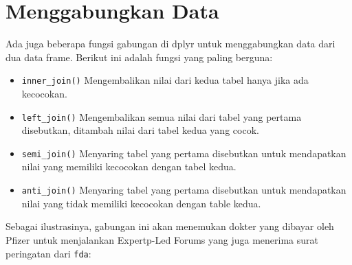 \documentclass[
]{book}
\newenvironment{Shaded}{\begin{snugshade}}{\end{snugshade}}
\newcommand{\DataTypeTok}[1]{\textcolor[rgb]{0.13,0.29,0.53}{#1}}
\newcommand{\KeywordTok}[1]{\textcolor[rgb]{0.13,0.29,0.53}{\textbf{#1}}}
\newcommand{\NormalTok}[1]{#1}
\newcommand{\OperatorTok}[1]{\textcolor[rgb]{0.81,0.36,0.00}{\textbf{#1}}}
\newcommand{\StringTok}[1]{\textcolor[rgb]{0.31,0.60,0.02}{#1}}
\providecommand{\tightlist}{%
  \setlength{\itemsep}{0pt}\setlength{\parskip}{0pt}}
\begin{document}
\hypertarget{menggabungkan-data}{%
\section{Menggabungkan Data}\label{menggabungkan-data}}

Ada juga beberapa fungsi gabungan di dplyr untuk menggabungkan data dari dua data frame. Berikut ini adalah fungsi yang paling berguna:

\begin{itemize}
\tightlist
\item
  \texttt{inner\_join()} Mengembalikan nilai dari kedua tabel hanya jika ada kecocokan.
\item
  \texttt{left\_join()} Mengembalikan semua nilai dari tabel yang pertama disebutkan, ditambah nilai dari tabel kedua yang cocok.
\item
  \texttt{semi\_join()} Menyaring tabel yang pertama disebutkan untuk mendapatkan nilai yang memiliki kecocokan dengan tabel kedua.
\item
  \texttt{anti\_join()} Menyaring tabel yang pertama disebutkan untuk mendapatkan nilai yang tidak memiliki kecocokan dengan table kedua.
\end{itemize}

Sebagai ilustrasinya, gabungan ini akan menemukan dokter yang dibayar oleh Pfizer untuk menjalankan Expertp-Led Forums yang juga menerima surat peringatan dari \texttt{fda}:

\begin{Shaded}
\end{Shaded}
\end{document}
